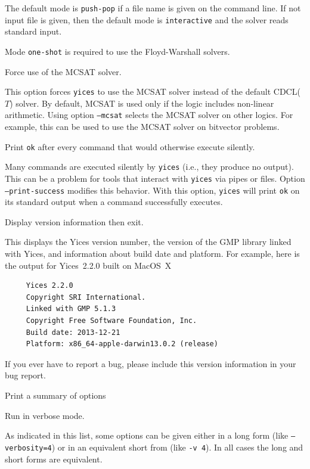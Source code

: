 \documentclass[11pt,twoside,fleqn,openright,titlepage]{cslreport}
\newenvironment{options}{
\begin{list}{}{
\setlength{\labelsep}{1.8ex}
\setlength{\labelwidth}{0pt}
\setlength{\itemindent}{-0.5\leftmargin}
\settowidth{\leftmargin}{\texttt{--}}
\renewcommand{\makelabel}{\optionlabel}}}
{\end{list}}
\newcommand*\optionlabel[1]{\hspace\labelsep\texttt{#1}}
\begin{document}
\begin{options}
  The default mode is \texttt{push-pop} if a file name is given on the
  command line. If  not input file is given, then  the default mode is
  \texttt{interactive} and the solver reads standard input.

  Mode \texttt{one-shot} is required to use the Floyd-Warshall solvers.

\item[--mcsat] Force use of the MCSAT solver.

  This option forces \texttt{yices} to use the MCSAT solver instead of
  the default CDCL($T$) solver. By default, MCSAT is used only if the
  logic includes non-linear arithmetic. Using option \texttt{--mcsat}
  selects the MCSAT solver on other logics. For example, this can be
  used to use the MCSAT solver on bitvector problems.

\item[--print-success] Print \texttt{ok} after every command that would
  otherwise execute silently.

  Many commands are executed silently by \texttt{yices} (i.e., they
  produce no output). This can be a problem for tools that interact
  with \texttt{yices} via pipes or files. Option
  \texttt{--print-success} modifies this behavior. With this option,
  \texttt{yices} will print \texttt{ok} on its standard output when a
  command successfully executes.

\item[--version, -V] Display version information then exit.

  This  displays the  Yices version  number,  the version  of the  GMP
  library  linked with  Yices, and  information about  build date  and
  platform. For example,  here is the output for  Yices~2.2.0 built on
  MacOS~X
  \begin{small}
  \begin{verbatim}
     Yices 2.2.0
     Copyright SRI International.
     Linked with GMP 5.1.3
     Copyright Free Software Foundation, Inc.
     Build date: 2013-12-21
     Platform: x86_64-apple-darwin13.0.2 (release)
  \end{verbatim}
  \end{small}
  \vspace*{-1em}
  If you ever have to report a bug, please include this version information
  in your bug report.

\item[--help, -h] Print a summary of options

\item[--verbosity=<level>, -v <level>] Run in verbose mode.
\end{options}
As indicated in this list, some options can be given either in a long
form (like \texttt{--verbosity=4}) or in an equivalent short from (like
\texttt{-v 4}). In all cases the long and short forms are equivalent.
\end{document}
